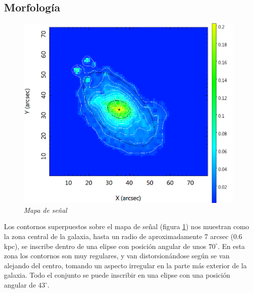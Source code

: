 \documentclass{article}
\begin{document}
\subsection{Morfología}
\begin{minipage}[b]{0.4\linewidth}
	\begin{figure}[H]
	\includegraphics[scale=.20]{imagen3.png}
	\centering	
	\caption{\emph{Mapa de señal}}
	\label{figura 3}
	\end{figure}
\end{minipage} \hfill \begin{minipage}[b]{0.5\linewidth} Los contornos superpuestos sobre el mapa de señal (figura \ref{figura 3}) nos muestran como la zona central de la galaxia, hasta un radio de aproximadamente 7 arcsec (0.6 kpc), se inscribe dentro de una elipse con posición angular de unos $70^{\circ}$. En esta zona los contornos son muy regulares, y van distorsionándose según se van alejando del centro, tomando un aspecto irregular en la parte más exterior de la galaxia. Todo el conjunto se puede inscribir en una elipse con una posición angular de $43^{\circ}$.
\end{minipage}
\end{document}
